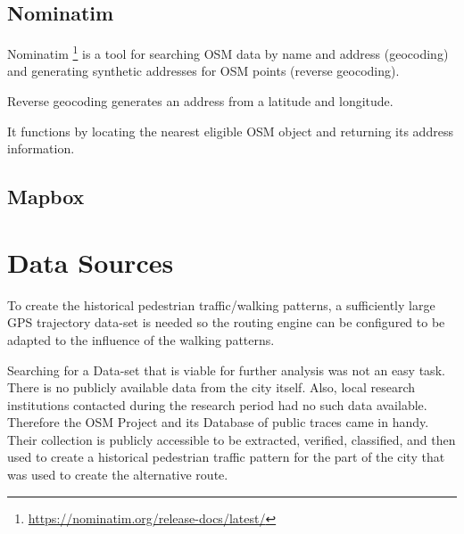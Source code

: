 \subsection{Nominatim}

Nominatim \footnote{\url{https://nominatim.org/release-docs/latest/}} is a tool for searching OSM data by name and address (geocoding) and generating synthetic addresses for OSM points (reverse geocoding). 

Reverse geocoding generates an address from a latitude and longitude.

It functions by locating the nearest eligible OSM object and returning its address information. 




\subsection{Mapbox}


\section{Data Sources}

To create the historical pedestrian traffic/walking patterns, a sufficiently large GPS trajectory data-set is needed so the routing engine can be configured to be adapted to the influence of the walking patterns. 

Searching for a Data-set that is viable for further analysis was not an easy task. There is no publicly available data from the city itself. Also, local research institutions contacted during the research period had no such data available. Therefore the OSM Project and its Database of public traces came in handy. Their collection is publicly accessible to be extracted, verified, classified, and then used to create a historical pedestrian traffic pattern for the part of the city that was used to create the alternative route.


